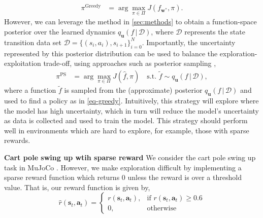 \documentclass{article}
\newcommand{\state}{\ensuremath{\mathbf{s}}}
\newcommand{\action}{\ensuremath{\mathbf{a}}}
\newcommand{\dataset}{\ensuremath{\mathcal{D}}}
\newcommand{\transitionFn}{\ensuremath{f}}
\newcommand{\policy}{\ensuremath{\pi}}
\renewcommand{\mid}{\,|\,}
\begin{document}
\begin{align} \label{eq-greedy}
  \policy^{\text{Greedy}} &= \arg \max_{\pi \in \Pi} J(f_{\mathbf{w}^{*}}, \pi).
\end{align}
However, we can leverage the method in \cref{sec:methods} to obtain a function-space posterior over the learned dynamics $q_{\mathbf{u}}(\transitionFn \mid \dataset)$,
where $\mathcal{D}$ represents the state transition data set \(\mathcal{D} = \{(s_{i},a_{i}), s_{i+1}\}_{i=0}^{N}\).
Importantly, the uncertainty represented by this posterior distribution can be used to balance the exploration-exploitation trade-off,
using approaches such as posterior sampling \cite{osbandWhyPosteriorSampling2017,osbandMoreEfficientReinforcement2013},
\begin{align} \label{eq-posterior-sampling}
  \policy^{\text{PS}} &= \arg \max_{\pi \in \Pi} J(\hat{f}, \pi)
\quad \text{s.t. } \tilde{\transitionFn} \sim q_{\mathbf{u}}({\transitionFn} \mid \dataset),
\end{align}
where a function $\tilde{\transitionFn}$ is sampled from the (approximate) posterior $q_{\mathbf{u}}({\transitionFn} \mid \dataset)$ and used to find a policy as
in \cref{eq-greedy}.
Intuitively, this strategy will explore where the model has high uncertainty, which in turn will reduce the model's uncertainty as data is collected and used to
train the model.
This strategy should perform well in environments which are hard to explore, for example, those
with sparse rewards.

\textbf{Cart pole swing up wtih sparse reward}
We consider the cart pole swing up task in MuJoCo \cite{todorov2012mujoco}.
However, we make exploration difficult by implementing a sparse reward function which returns $0$ unless the reward is over a threshold value. That is, our reward function is given by,
$$\hat{r}(\state_{t}, \action_{t}) =
\begin{cases}
    r(\state_{t}, \action_{t}),& \text{if } r(\state_{t}, \action_{t})\geq 0.6\\
    0,              & \text{otherwise}
\end{cases}
$$

\end{document}
